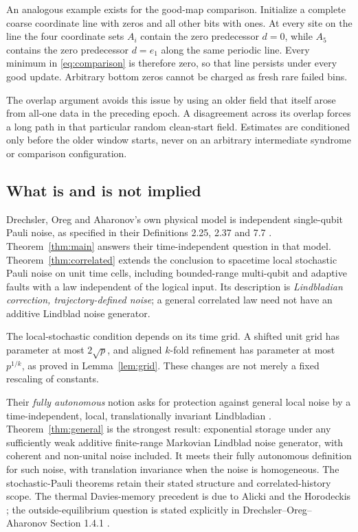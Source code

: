 An analogous example exists for the good-map comparison.
Initialize a complete coarse coordinate line with zeros and all
other bits with ones. At every site on the line the four coordinate
sets \(A_i\) contain the zero predecessor \(d=0\), while \(A_5\)
contains the zero predecessor \(d=e_1\) along the same periodic
line. Every minimum in \eqref{eq:comparison} is therefore zero,
so that line persists under every good update. Arbitrary bottom
zeros cannot be charged as fresh rare failed bins.

The overlap argument avoids this issue by using an older field
that itself arose from all-one data in the preceding epoch.
A disagreement across its overlap forces a long path in that
particular random clean-start field. Estimates are conditioned
only before the older window starts, never on an arbitrary
intermediate syndrome or comparison configuration.

\subsection{What is and is not implied}

Drechsler, Oreg and Aharonov's own physical model is independent
single-qubit Pauli noise, as specified in their Definitions 2.25,
2.37 and 7.7 \cite{DOA}. Theorem~\ref{thm:main} answers their
time-independent question in that model.
Theorem~\ref{thm:correlated} extends the conclusion to spacetime local
stochastic Pauli noise on unit time cells, including bounded-range
multi-qubit and adaptive faults with a law independent of the logical
input. Its description is \emph{Lindbladian correction,
trajectory-defined noise}; a general correlated law need not have
an additive Lindblad noise generator.

The local-stochastic condition depends on its time grid. A shifted
unit grid has parameter at most \(2\sqrt p\), and aligned \(k\)-fold
refinement has parameter at most \(p^{1/k}\), as proved in
Lemma~\ref{lem:grid}. These changes are not merely a fixed
rescaling of constants.

Their \emph{fully autonomous} notion asks for protection against
general local noise by a time-independent, local, translationally
invariant Lindbladian
\cite[Section 1.5.1, Table 1]{DOA}.
Theorem~\ref{thm:general} is the strongest result: exponential storage
under any sufficiently weak additive finite-range Markovian Lindblad
noise generator, with coherent and non-unital noise included.
It meets their fully autonomous definition for such noise, with
translation invariance when the noise is homogeneous.
The stochastic-Pauli theorems retain their stated structure and
correlated-history scope.
The thermal Davies-memory precedent is due to Alicki and the
Horodeckis \cite{AHHH2010}; the outside-equilibrium question is stated
explicitly in Drechsler--Oreg--Aharonov Section 1.4.1 \cite{DOA}.

